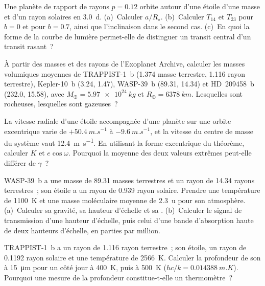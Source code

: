 \begin{exercise}[$\star\star$]\label{exo:b3:exoplanets:5}
Une planète de rapport de rayons $p = 0.12$ orbite autour d'une étoile d'une
masse et d'un rayon solaires en \qty{3.0}{d}. (a)~Calculer $a/R_\star$. (b)~Calculer
$T_{14}$ et $T_{23}$ pour $b = 0$ et pour $b = 0.7$, ainsi que l'inclinaison
dans le second cas. (c)~En quoi la forme de la courbe de lumière permet-elle de
distinguer un transit central d'un transit rasant~?
\end{exercise}

\begin{exercise}[$\star\star$]\label{exo:b3:exoplanets:6}
À partir des masses et des rayons de l'Exoplanet Archive, calculer les masses
volumiques moyennes de TRAPPIST-1~b (1.374 masse terrestre, 1.116 rayon
terrestre), Kepler-10~b (3.24, 1.47), WASP-39~b (89.31, 14.34) et
HD~209458~b (232.0, 15.58), avec $M_\oplus = \qty{5.97e24}{kg}$ et $R_\oplus =
\qty{6378}{km}$. Lesquelles sont rocheuses, lesquelles sont gazeuses~?
\end{exercise}

\begin{exercise}[$\star\star$]\label{exo:b3:exoplanets:7}
La vitesse radiale d'une étoile accompagnée d'une planète sur une orbite excentrique
varie de $+\qty{50.4}{m.s^{-1}}$ à $-\qty{9.6}{m.s^{-1}}$, et la vitesse du centre
de masse du système vaut \qty{12.4}{m.s^{-1}}. En utilisant la forme excentrique du
théorème, calculer $K$ et $e\cos\omega$. Pourquoi la moyenne des deux valeurs
extrêmes peut-elle différer de $\gamma$~?
\end{exercise}

\begin{exercise}[$\star\star$]\label{exo:b3:exoplanets:8}
WASP-39~b a une masse de 89.31 masses terrestres et un rayon de 14.34 rayons
terrestres~; son étoile a un rayon de 0.939 rayon solaire. Prendre une température de
\qty{1100}{K} et une masse moléculaire moyenne de \qty{2.3}{u} pour son atmosphère.
(a)~Calculer sa gravité, sa hauteur d'échelle et sa .
(b)~Calculer le signal de transmission d'une hauteur d'échelle, puis celui d'une
bande d'absorption haute de deux hauteurs d'échelle, en parties par million.
\end{exercise}

\begin{exercise}[$\star\star$]\label{exo:b3:exoplanets:9}
TRAPPIST-1~b a un rayon de 1.116 rayon terrestre~; son étoile, un rayon de 0.1192
rayon solaire et une température de \qty{2566}{K}. Calculer la profondeur de son
 à \qty{15}{\micro m} pour un côté jour à \qty{400}{K}, puis à
\qty{500}{K} ($hc/k = \qty{0.014388}{m.K}$). Pourquoi une mesure de la profondeur
constitue-t-elle un thermomètre~?
\end{exercise}

